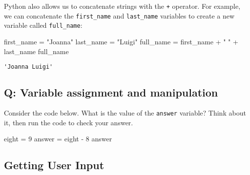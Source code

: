\documentclass[
  letterpaper,
  DIV=11,
  numbers=noendperiod]{scrreprt}
\newenvironment{Shaded}{\begin{snugshade}}{\end{snugshade}}
\newcommand{\DecValTok}[1]{\textcolor[rgb]{0.68,0.00,0.00}{#1}}
\newcommand{\NormalTok}[1]{\textcolor[rgb]{0.00,0.23,0.31}{#1}}
\newcommand{\OperatorTok}[1]{\textcolor[rgb]{0.37,0.37,0.37}{#1}}
\newcommand{\StringTok}[1]{\textcolor[rgb]{0.13,0.47,0.30}{#1}}
\begin{document}
Python also allows us to concatenate strings with the \texttt{+}
operator. For example, we can concatenate the \texttt{first\_name} and
\texttt{last\_name} variables to create a new variable called
\texttt{full\_name}:

\begin{Shaded}
\begin{Highlighting}[]
\NormalTok{first\_name }\OperatorTok{=} \StringTok{"Joanna"}
\NormalTok{last\_name }\OperatorTok{=} \StringTok{"Luigi"}
\NormalTok{full\_name }\OperatorTok{=}\NormalTok{ first\_name }\OperatorTok{+} \StringTok{" "} \OperatorTok{+}\NormalTok{ last\_name}
\NormalTok{full\_name}
\end{Highlighting}
\end{Shaded}

\begin{verbatim}
'Joanna Luigi'
\end{verbatim}

\begin{tcolorbox}[enhanced jigsaw, colframe=quarto-callout-tip-color-frame, opacityback=0, titlerule=0mm, bottomrule=.15mm, breakable, leftrule=.75mm, colbacktitle=quarto-callout-tip-color!10!white, title=\textcolor{quarto-callout-tip-color}{\faLightbulb}\hspace{0.5em}{Practice}, rightrule=.15mm, coltitle=black, opacitybacktitle=0.6, colback=white, left=2mm, arc=.35mm, toptitle=1mm, bottomtitle=1mm, toprule=.15mm]

\subsection{Q: Variable assignment and
manipulation}\label{q-variable-assignment-and-manipulation}

Consider the code below. What is the value of the \texttt{answer}
variable? Think about it, then run the code to check your answer.

\begin{Shaded}
\begin{Highlighting}[]
\NormalTok{eight }\OperatorTok{=} \DecValTok{9}
\NormalTok{answer }\OperatorTok{=}\NormalTok{ eight }\OperatorTok{{-}} \DecValTok{8}
\NormalTok{answer}
\end{Highlighting}
\end{Shaded}

\end{tcolorbox}

\subsection{Getting User Input}\label{getting-user-input}
\end{document}
